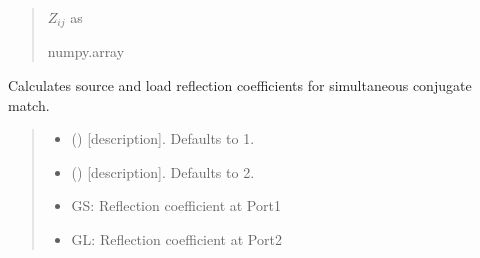 \documentclass[letterpaper,10pt,english]{sphinxmanual}
\begin{document}
\begin{fulllineitems}
\begin{fulllineitems}
\begin{quote}
\begin{description}
\begin{itemize}
\end{itemize}

\sphinxAtStartPar
\(Z_{i j}\) as 

\sphinxAtStartPar
numpy.array

\end{description}\end{quote}

\end{fulllineitems}


\begin{fulllineitems}
\label{\detokenize{touchstone:touchstone.spfile.Z_conjmatch}}
\pysigstartsignatures
{}
\pysigstopsignatures
\sphinxAtStartPar
Calculates source and load reflection coefficients for simultaneous conjugate match.
\begin{quote}\begin{description}
\begin{itemize}
\item {}
\sphinxAtStartPar
{} (\sphinxstyleliteralemphasis{\sphinxupquote{, }}) \textendash{} {[}description{]}. Defaults to 1.

\item {}
\sphinxAtStartPar
{} (\sphinxstyleliteralemphasis{\sphinxupquote{, }}) \textendash{} {[}description{]}. Defaults to 2.

\end{itemize}

\sphinxAtStartPar
\begin{itemize}
\item {}
\sphinxAtStartPar
GS: Reflection coefficient at Port\sphinxhyphen{}1

\item {}
\sphinxAtStartPar
GL: Reflection coefficient at Port\sphinxhyphen{}2


\end{itemize}
\end{description}
\end{quote}
\end{fulllineitems}
\end{fulllineitems}
\end{document}
